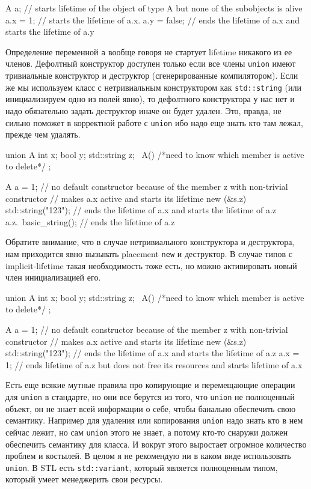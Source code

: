 \documentclass{article}
\begin{document}
\begin{enumerate}
\begin{cppcode}[numbers = none]
A a;         // starts lifetime of the object of type A but none of the subobjects is alive
a.x = 1;     // starts the lifetime of a.x.
a.y = false; // ends the lifetime of a.x and starts the lifetime of a.y
\end{cppcode}
Определение переменной \verb"a" вообще говоря не стартует lifetime никакого из ее членов.
Дефолтный конструктор доступен только если все члены \verb"union" имеют тривиальные конструктор и деструктор (сгенерированные компилятором).
Если же мы используем класс с нетривиальным конструктором как \verb"std::string" (или инициализируем одно из полей явно), то дефолтного конструктора у нас нет и надо обязательно задать деструктор иначе он будет удален.
Это, правда, не сильно поможет в корректной работе с \verb"union" ибо надо еще знать кто там лежал, прежде чем удалять.
\begin{cppcode}[numbers = none]
union A {
  int x;
  bool y;
  std::string z;
  ~A() { /*need to know which member is active to delete*/ }
};

A a = {1}; // no default constructor because of the member z with non-trivial constructor
           // makes a.x active and starts its lifetime
new (&s.z) std::string("123"); // ends the lifetime of a.x and starts the lifetime of a.z
a.z.~basic_string(); // ends the lifetime of a.z
\end{cppcode}
Обратите внимание, что в случае нетривиального конструктора и деструктора, нам приходится явно вызывать placement \verb"new" и деструктор.
В случае типов с implicit-lifetime такая необходимость тоже есть, но можно активировать новый член инициализацией его.
\begin{cppcode}[numbers = none]
union A {
  int x;
  bool y;
  std::string z;
  ~A() { /*need to know which member is active to delete*/ }
};

A a = {1}; // no default constructor because of the member z with non-trivial constructor
           // makes a.x active and starts its lifetime
new (&s.z) std::string("123"); // ends the lifetime of a.x and starts the lifetime of a.z
a.x = 1;   // ends lifetime of a.z but does not free its resources and starts lifetime of a.x
\end{cppcode}
Есть еще всякие мутные правила про копирующие и перемещающие операции для \verb"union" в стандарте, но они все берутся из того, что \verb"union" не полноценный объект, он не знает всей информации о себе, чтобы банально обеспечить свою семантику.
Например для удаления или копирования \verb"union" надо знать кто в нем сейчас лежит, но сам \verb"union" этого не знает, а потому кто-то снаружи должен обеспечить семантику для класса.
И вокруг этого выростает огромное количество проблем и костылей.
В целом я не рекомендую ни в каком виде использовать \verb"union".
В STL есть \verb"std::variant", который является полноценным типом, который умеет менеджерить свои ресурсы.


\end{enumerate}
\end{document}
